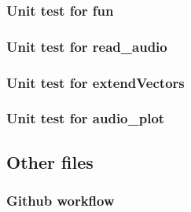\documentclass[a4paper,12pt]{article}
\begin{document}
\subsubsection*{Unit test for fun}

\subsubsection*{Unit test for read\_audio}

\subsubsection*{Unit test for extendVectors}

\subsubsection*{Unit test for audio\_plot}


\pagebreak
\subsection*{Other files}
\subsubsection*{Github workflow}

\end{document}
